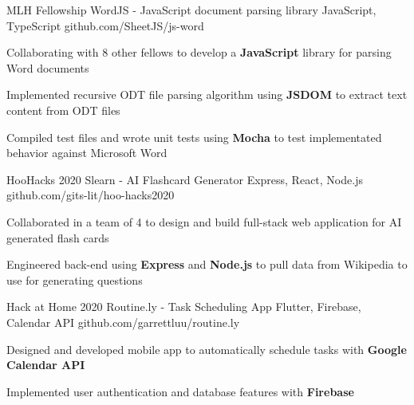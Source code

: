 \documentclass[]{awesome-cv}
\begin{document}
\vspace{-5mm}
\begin{cventries}

	\cventry
  {MLH Fellowship}
  {WordJS - JavaScript document parsing library}
  {JavaScript, TypeScript}
  {github.com/SheetJS/js-word}
  {\begin{cvitems}
    \item {Collaborating with 8 other fellows to develop a \textbf{JavaScript} library
      for parsing Word documents}
    \item{Implemented recursive ODT file parsing algorithm using \textbf{JSDOM}
      to extract text content from ODT files}
    \item{Compiled test files and wrote unit tests using \textbf{Mocha} to test
      implementated behavior against Microsoft Word}
    \end{cvitems}}

  \vspace{-3mm}
	\cventry
  {HooHacks 2020}
  {Slearn - AI Flashcard Generator}
	{Express, React, Node.js}
	{github.com/gits-lit/hoo-hacks2020}
  {\begin{cvitems}
    \item{Collaborated in a team of 4 to design and build full-stack web
      application for AI generated flash cards}
    \item{Engineered back-end using \textbf{Express} and \textbf{Node.js} to
      pull data from Wikipedia to use for generating questions}
    \end{cvitems}}

  \vspace{-3mm}
	\cventry
  {Hack at Home 2020}
  {Routine.ly - Task Scheduling App}
	{Flutter, Firebase, Calendar API}
	{github.com/garrettluu/routine.ly}
  {\begin{cvitems}
    \item{Designed and developed mobile app to automatically schedule tasks with
      \textbf{Google Calendar API}}
    \item{Implemented user authentication and database features with
      \textbf{Firebase}}
  \end{cvitems}}

\end{cventries}

\end{document}
